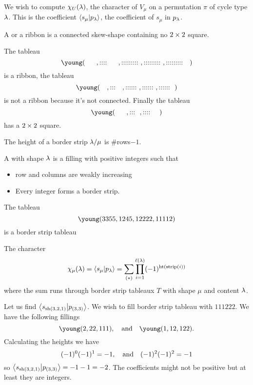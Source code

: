 \documentclass[12pt]{memoir}
\DeclareMathOperator{\sh}{sh}
\begin{document}
We wish to compute $\chi_U(\lambda)$, the character of $V_\mu$ on a permutation $\pi$ of cycle type $\lambda$. This is the coefficient $\braket{s_\mu}{p_\lambda}$, the coefficient of $s_\mu$ in $p_\lambda$.

\begin{Def}
    A  or a ribbon is a connected skew-shape containing no $2\times 2$ square.
\end{Def}

\begin{Ex}
    The tableau
    $$\young(~~~~~,::::~~~~~,:::::::::~,:::::::::~,:::::::::~~~)$$
    is a ribbon, the tableau
    $$\young(~~~,:::~~~,::::::~,::::::~,::::::~~)$$
    is not a ribbon because it's not connected. Finally the tableau 
    $$\young(~~~~~,:::~~,::::~~~~)$$
    has a $2\times 2$ square.
\end{Ex}

\begin{Def}
    The height of a border strip $\lambda/\mu$ is $\#$rows$-1$.\par
    A  with shape $\lambda$ is a filling with positive integers such that 
    \begin{itemize}
        \item row and columns are weakly increasing 
        \item Every integer forms a border strip.
    \end{itemize}
\end{Def}

\begin{Ex}
    The tableau 
    $$\young(3355,1245,12222,11112)$$
    is a border strip tableau
\end{Ex}

\begin{Th}
    The character 
    $$\chi_\mu(\lambda)=\braket{s_\mu}{p_\lambda}=\sum_{(\ast)}\prod_{i=1}^{\ell(\lambda)}(-1)^{\operatorname{ht}(\text{strip}(i))}$$
    where the sum runs through border strip tableaux $T$ with shape $\mu$ and content $\lambda$.
\end{Th}

\begin{Ex}
    Let us find $\braket{s_{\sh(3,2,1)}}{p_{(3,3)}}$. We wish to fill border strip tableau with $111222$. We have the following fillings 
    $$\young(2,22,111),\word{and}\young(1,12,122).$$
    Calculating the heights we have 
    $$(-1)^0(-1)^1=-1,\quad\text{and}\quad(-1)^2(-1)^2=-1$$
    so $\braket{s_{\sh(3,2,1)}}{p_{(3,3)}}=-1-1=-2$.
The coefficients might not be positive but at least they are integers. 
\end{Ex}
\end{document}
